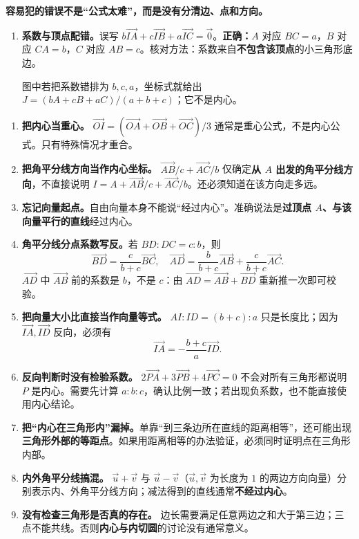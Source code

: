 \begin{trapbox}
\par\noindent\begin{minipage}{\linewidth}
\textbf{容易犯的错误不是“公式太难”，而是没有分清边、点和方向。}
\begin{enumerate}
\item \textbf{系数与顶点配错。}误写 $b\vec{IA}+c\vec{IB}+a\vec{IC}=\vec0$。\textbf{正确：}$A$ 对应 $BC=a$，$B$ 对应 $CA=b$，$C$ 对应 $AB=c$。核对方法：系数来自\textbf{不包含该顶点}的小三角形底边。

图中若把系数错排为 $b,c,a$，坐标式就给出 $J=(bA+cB+aC)/(a+b+c)$；它不是内心。
\end{enumerate}
\end{minipage}\par
\begin{enumerate}[start=2]
\item \textbf{把内心当重心。} $\vec{OI}=(\vec{OA}+\vec{OB}+\vec{OC})/3$ 通常是重心公式，不是内心公式。只有特殊情况才重合。
\item \begin{minipage}[t]{\linewidth}\textbf{把角平分线方向当作内心坐标。} $\vec{AB}/c+\vec{AC}/b$ 仅确定\textbf{从 $A$ 出发的角平分线方向}，不直接说明 $I=A+\vec{AB}/c+\vec{AC}/b$。还必须知道在该方向走多远。

\end{minipage}
\item \textbf{忘记向量起点。}自由向量本身不能说“经过内心”。准确说法是\textbf{过顶点 $A$、与该向量平行的直线}经过内心。
\item \textbf{角平分线分点系数写反。}若 $BD:DC=c:b$，则
\[\vec{BD}=\frac c{b+c}\vec{BC},\quad
\vec{AD}=\frac b{b+c}\vec{AB}+\frac c{b+c}\vec{AC}.\]
$\vec{AD}$ 中 $\vec{AB}$ 前的系数是 $b$，不是 $c$：由 $\vec{AD}=\vec{AB}+\vec{BD}$ 重新推一次即可校验。
\item \textbf{把向量大小比直接当作向量等式。} $AI:ID=(b+c):a$ 只是长度比；因为 $\vec{IA},\vec{ID}$ 反向，必须有\[\vec{IA}=-\frac{b+c}{a}\vec{ID}.\]
\item \textbf{反向判断时没有检验系数。} $2\vec{PA}+3\vec{PB}+4\vec{PC}=0$ 不会对所有三角形都说明 $P$ 是内心。需要先计算 $a:b:c$，确认比例一致；若出现负系数，也不能直接使用内心结论。
\item \begin{minipage}[t]{\linewidth}\textbf{把“内心在三角形内”漏掉。}单靠“到三条边所在直线的距离相等”，还可能出现\textbf{三角形外部的等距点}。如果用距离相等的办法验证，必须同时证明点在三角形内部。

\end{minipage}
\item \textbf{内外角平分线搞混。} $\vec u+\vec v$ 与 $\vec u-\vec v$（$\vec u,\vec v$ 为长度为 $1$ 的两边方向向量）分别表示内、外角平分线方向；减法得到的直线通常\textbf{不经过内心}。
\item \textbf{没有检查三角形是否真的存在。} 边长需要满足任意两边之和大于第三边；三点不能共线。否则\textbf{内心与内切圆}的讨论没有通常意义。
\end{enumerate}
\end{trapbox}
